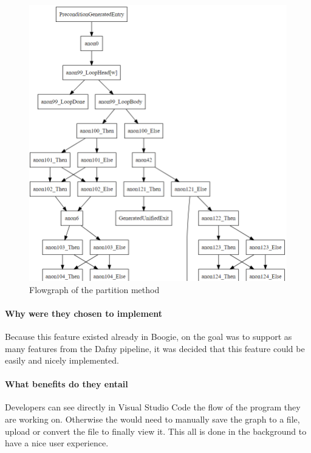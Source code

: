 \begin{figure}[H]
	\centering
	\includegraphics[width=1.0\textwidth]{img/flowgraph}
	\caption{Flowgraph of the partition method}
	\label{fig:flowgraph}
\end{figure}


\paragraph{Why were they chosen to implement}
Because this feature existed already in Boogie, on the goal was to support as many features from the Dafny pipeline, it was decided that this feature could be easily and nicely implemented. 

\paragraph{What benefits do they entail}
Developers can see directly in Visual Studio Code the flow of the program they are working on. Otherwise the would need to manually save the graph to a file, upload or convert the file to finally view it. This all is done in the background to have a nice user experience.

